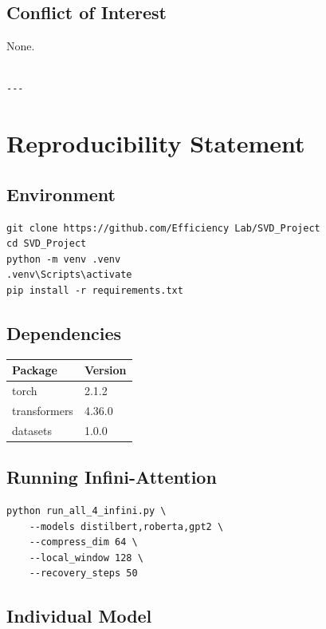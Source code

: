 \subsection{Conflict of Interest}

None.
\begin{lstlisting}

---
\end{lstlisting}


\section{Reproducibility Statement}

\subsection{Environment}

\begin{lstlisting}
git clone https://github.com/Efficiency Lab/SVD_Project
cd SVD_Project
python -m venv .venv
.venv\Scripts\activate
pip install -r requirements.txt
\end{lstlisting}

\subsection{Dependencies}

\begin{table}[H]
\centering
\small
\begin{tabular}{ll}
\toprule
\textbf{Package} & \textbf{Version} \\
\midrule
torch & 2.1.2 \\
transformers & 4.36.0 \\
datasets & 1.0.0 \\
\bottomrule
\end{tabular}
\end{table}

\subsection{Running Infini-Attention}

\begin{lstlisting}
python run_all_4_infini.py \
    --models distilbert,roberta,gpt2 \
    --compress_dim 64 \
    --local_window 128 \
    --recovery_steps 50
\end{lstlisting}

\subsection{Individual Model}

